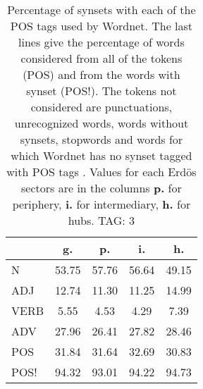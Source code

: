 \begin{table}[h!]
\begin{center}
\begin{tabular}{| l | c | c | c | c |}\hline
 & g. & p. & i. & h. \\\hline
N & 53.75  & 57.76  & 56.64  & 49.15 \\\hline
ADJ & 12.74  & 11.30  & 11.25  & 14.99 \\\hline
VERB & 5.55  & 4.53  & 4.29  & 7.39 \\\hline
ADV & 27.96  & 26.41  & 27.82  & 28.46 \\\hline
POS & 31.84  & 31.64  & 32.69  & 30.83 \\\hline
POS! & 94.32  & 93.01  & 94.22  & 94.73 \\\hline
\end{tabular}
\caption{Percentage of synsets with each of the POS tags used by Wordnet. The last lines give the percentage of words considered from all of the tokens (POS) and from the words with synset (POS!). The tokens not considered are punctuations, unrecognized words, words without synsets, stopwords and words for which Wordnet has no synset  tagged with POS tags . Values for each Erd\"os sectors are in the columns {{\bf p.}} for periphery, {{\bf i.}} for intermediary, {{\bf h.}} for hubs. TAG: 3}
\end{center}
\end{table}